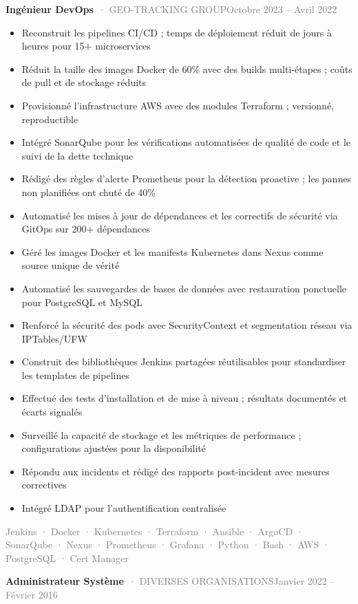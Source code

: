 \documentclass[10pt,a4paper]{article}
\newcommand{\cventry}[3]{\textbf{#1}\ \textcolor{graytext}{· #2}\hfill\textcolor{graytext}{\small #3}\par}
\newcommand{\tagline}[1]{\textcolor{graytext}{\small #1}\par}
\begin{document}
\vspace{3pt}
\cventry{Ingénieur DevOps}{GEO-TRACKING GROUP}{Octobre 2023 – Avril 2022}
\begin{itemize}
  \item Reconstruit les pipelines CI/CD ; temps de déploiement réduit de jours à heures pour 15+ microservices
  \item Réduit la taille des images Docker de 60\% avec des builds multi-étapes ; coûts de pull et de stockage réduits
  \item Provisionné l'infrastructure AWS avec des modules Terraform ; versionné, reproductible
  \item Intégré SonarQube pour les vérifications automatisées de qualité de code et le suivi de la dette technique
  \item Rédigé des règles d'alerte Prometheus pour la détection proactive ; les pannes non planifiées ont chuté de 40\%
  \item Automatisé les mises à jour de dépendances et les correctifs de sécurité via GitOps sur 200+ dépendances
  \item Géré les images Docker et les manifests Kubernetes dans Nexus comme source unique de vérité
  \item Automatisé les sauvegardes de bases de données avec restauration ponctuelle pour PostgreSQL et MySQL
  \item Renforcé la sécurité des pods avec SecurityContext et segmentation réseau via IPTables/UFW
  \item Construit des bibliothèques Jenkins partagées réutilisables pour standardiser les templates de pipelines
  \item Effectué des tests d'installation et de mise à niveau ; résultats documentés et écarts signalés
  \item Surveillé la capacité de stockage et les métriques de performance ; configurations ajustées pour la disponibilité
  \item Répondu aux incidents et rédigé des rapports post-incident avec mesures correctives
  \item Intégré LDAP pour l'authentification centralisée
\end{itemize}
\tagline{Jenkins · Docker · Kubernetes · Terraform · Ansible · ArgoCD · SonarQube · Nexus · Prometheus · Grafana · Python · Bash · AWS · PostgreSQL · Cert Manager}
\vspace{1pt}
\vspace{3pt}
\cventry{Administrateur Système}{DIVERSES ORGANISATIONS}{Janvier 2022 – Février 2016}
\end{document}
